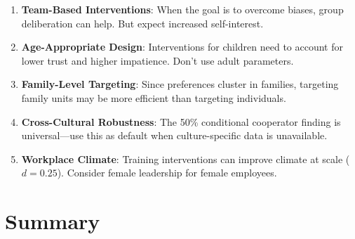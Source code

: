 \begin{tcolorbox}[colback=green!5!white, colframe=green!75!black,
    title=Practical Implications]
\begin{enumerate}
\item \textbf{Team-Based Interventions}: When the goal is to overcome biases, group deliberation can help. But expect increased self-interest.

\item \textbf{Age-Appropriate Design}: Interventions for children need to account for lower trust and higher impatience. Don't use adult parameters.

\item \textbf{Family-Level Targeting}: Since preferences cluster in families, targeting family units may be more efficient than targeting individuals.

\item \textbf{Cross-Cultural Robustness}: The 50\% conditional cooperator finding is universal---use this as default when culture-specific data is unavailable.

\item \textbf{Workplace Climate}: Training interventions can improve climate at scale ($d = 0.25$). Consider female leadership for female employees.
\end{enumerate}
\end{tcolorbox}


\section{Summary}
\label{sec:su-summary}


